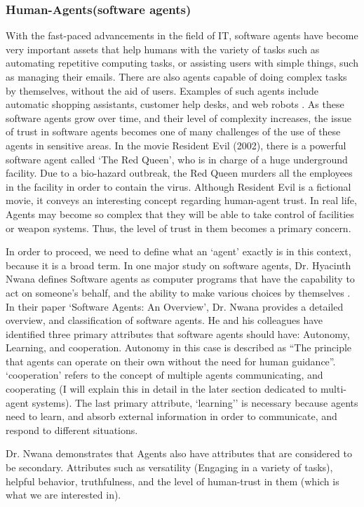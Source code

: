 \documentclass[runningheads,a4paper]{llncs}
\begin{document}
\subsubsection{Human-Agents(software agents)}
With the fast-paced advancements in the field of IT, software agents have become very important assets that help humans with the variety of tasks such as automating repetitive computing tasks, or assisting users with simple things, such as managing their emails. There are also agents capable of doing complex tasks by themselves, without the aid of users. Examples of such agents include automatic shopping assistants, customer help desks, and web robots \cite{IntelligentAgent}. As these software agents grow over time, and their level of complexity increases, the issue of trust in software agents becomes one of many challenges of the use of these agents in sensitive areas. In the movie Resident Evil (2002), there is a powerful software agent called `The Red Queen', who is in charge of a huge underground facility. Due to a bio-hazard outbreak, the Red Queen murders all the employees in the facility in order to contain the virus. Although Resident Evil is a fictional movie, it conveys an interesting concept regarding human-agent trust. In real life, Agents may become so complex that they will be able to take control of facilities or weapon systems. Thus, the level of trust in them becomes a primary concern.

In order to proceed, we need to define what an `agent' exactly is in this context, because it is a broad term. In one major study on software agents, Dr. Hyacinth Nwana defines Software agents as computer programs that have the capability to act on someone's behalf, and the ability to make various choices by themselves \cite{nwana1996software}. In their paper `Software Agents: An Overview', Dr. Nwana provides a detailed overview, and classification of software agents. He and his colleagues have identified three primary attributes that software agents should have: Autonomy, Learning, and cooperation. Autonomy in this case is described as ``The principle that agents can operate on their own without the need for human guidance''. `cooperation' refers to the concept of multiple agents communicating, and cooperating (I will explain this in detail in the later section dedicated to multi-agent systems). The last primary attribute, `learning'' is necessary because agents need to learn, and absorb external information in order to communicate, and respond to different situations.

Dr. Nwana demonstrates that Agents also have attributes that are considered to be secondary. Attributes such as versatility (Engaging in a variety of tasks), helpful behavior, truthfulness, and the level of human-trust in them (which is what we are interested in).
\end{document}
